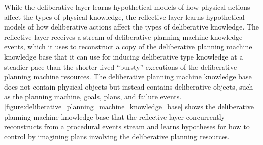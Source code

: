 While the deliberative layer learns hypothetical models of how
physical actions affect the types of physical knowledge, the
reflective layer learns hypothetical models of how deliberative
actions affect the types of deliberative knowledge.  The reflective
layer receives a stream of deliberative planning machine knowledge
events, which it uses to reconstruct a copy of the deliberative
planning machine knowledge base that it can use for inducing
deliberative type knowledge at a steadier pace than the shorter-lived
``bursty'' executions of the deliberative planning machine resources.
The deliberative planning machine knowledge base does not contain
physical objects but instead contains deliberative objects, such as
the planning machine, goals, plans, and failure events.
{\mbox{\autoref{figure:deliberative_planning_machine_knowledge_base}}}
shows the deliberative planning machine knowledge base that the
reflective layer concurrently reconstructs from a procedural events
stream and learns hypotheses for how to control by imagining plans
involving the deliberative planning resources.
